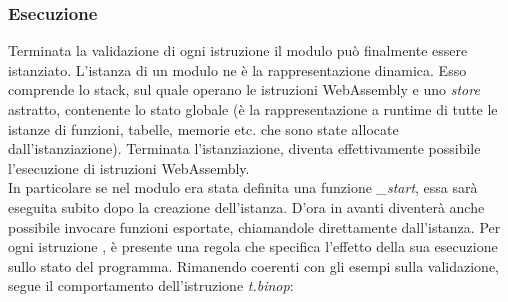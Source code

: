 \subsubsection{Esecuzione}
Terminata la validazione di ogni istruzione il modulo può finalmente essere istanziato.
L'istanza di un modulo ne è la rappresentazione dinamica. Esso comprende lo stack, sul quale operano le istruzioni WebAssembly e uno \emph{store} astratto, contenente lo stato globale (è la rappresentazione a runtime di tutte le istanze di funzioni, tabelle, memorie etc. che sono state allocate dall'istanziazione).
Terminata l'istanziazione, diventa effettivamente possibile l'esecuzione di istruzioni WebAssembly.
\\In particolare se nel modulo era stata definita una funzione \emph{\_start}, essa sarà eseguita subito dopo la creazione dell'istanza. D'ora in avanti diventerà anche possibile invocare funzioni esportate, chiamandole direttamente dall'istanza.
Per ogni istruzione , è presente una regola che specifica l'effetto della sua esecuzione sullo stato del programma. Rimanendo coerenti con gli esempi sulla validazione, segue il comportamento dell'istruzione \emph{t.binop}:


